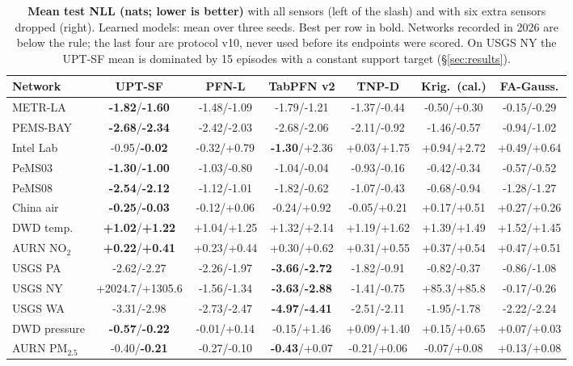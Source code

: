\begin{table}[t]\centering\small
\caption{\textbf{Mean test NLL (nats; lower is better)} with all sensors (left of the slash) and with six extra sensors dropped (right). Learned models: mean over three seeds. Best per row in bold. Networks recorded in 2026 are below the rule; the last four are protocol v10, never used before its endpoints were scored. On USGS NY the UPT-SF mean is dominated by 15 episodes with a constant support target (\S\ref{sec:results}).}
\label{tab:main}
\setlength{\tabcolsep}{3pt}
\begin{tabular}{lcccccc}
\toprule
Network & UPT-SF & PFN-L & TabPFN v2 & TNP-D & Krig.\ (cal.) & FA-Gauss. \\
\midrule
METR-LA & \textbf{-1.82}/\textbf{-1.60} & -1.48/-1.09 & -1.79/-1.21 & -1.37/-0.44 & -0.50/+0.30 & -0.15/-0.29 \\
PEMS-BAY & \textbf{-2.68}/\textbf{-2.34} & -2.42/-2.03 & -2.68/-2.06 & -2.11/-0.92 & -1.46/-0.57 & -0.94/-1.02 \\
Intel Lab & -0.95/\textbf{-0.02} & -0.32/+0.79 & \textbf{-1.30}/+2.36 & +0.03/+1.75 & +0.94/+2.72 & +0.49/+0.64 \\
PeMS03 & \textbf{-1.30}/\textbf{-1.00} & -1.03/-0.80 & -1.04/-0.04 & -0.93/-0.16 & -0.42/-0.34 & -0.57/-0.52 \\
PeMS08 & \textbf{-2.54}/\textbf{-2.12} & -1.12/-1.01 & -1.82/-0.62 & -1.07/-0.43 & -0.68/-0.94 & -1.28/-1.27 \\
China air & \textbf{-0.25}/\textbf{-0.03} & -0.12/+0.06 & -0.24/+0.92 & -0.05/+0.21 & +0.17/+0.51 & +0.27/+0.26 \\
\midrule
DWD temp. & \textbf{+1.02}/\textbf{+1.22} & +1.04/+1.25 & +1.32/+2.14 & +1.19/+1.62 & +1.39/+1.49 & +1.52/+1.45 \\
AURN NO$_2$ & \textbf{+0.22}/\textbf{+0.41} & +0.23/+0.44 & +0.30/+0.62 & +0.31/+0.55 & +0.37/+0.54 & +0.47/+0.51 \\
USGS PA & -2.62/-2.27 & -2.26/-1.97 & \textbf{-3.66}/\textbf{-2.72} & -1.82/-0.91 & -0.82/-0.37 & -0.86/-1.08 \\
USGS NY & +2024.7/+1305.6 & -1.56/-1.34 & \textbf{-3.63}/\textbf{-2.88} & -1.41/-0.75 & +85.3/+85.8 & -0.17/-0.26 \\
USGS WA & -3.31/-2.98 & -2.73/-2.47 & \textbf{-4.97}/\textbf{-4.41} & -2.51/-2.11 & -1.95/-1.78 & -2.22/-2.24 \\
DWD pressure & \textbf{-0.57}/\textbf{-0.22} & -0.01/+0.14 & -0.15/+1.46 & +0.09/+1.40 & +0.15/+0.65 & +0.07/+0.03 \\
AURN PM$_{2.5}$ & -0.40/\textbf{-0.21} & -0.27/-0.10 & \textbf{-0.43}/+0.07 & -0.21/+0.06 & -0.07/+0.08 & +0.13/+0.08 \\
\bottomrule
\end{tabular}
\end{table}